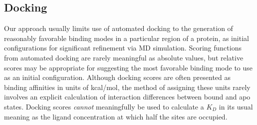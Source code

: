 \documentclass[12pt]{article}
\begin{document}
 \subsection{Docking} Our approach usually limits use of automated docking to the generation of reasonably favorable binding modes in a particular region of a protein, as initial configurations for significant refinement via MD simulation.  Scoring functions from automated docking are rarely meaningful as absolute values, but relative scores may be appropriate for suggesting the most favorable binding mode to use as an initial configuration.  Although docking scores are often presented as binding affinities in units of kcal/mol, the method of assigning these units rarely involves an explicit calculation of interaction differences between bound and apo states.  Docking scores \emph{cannot} meaningfully be used to calculate a $K_{D}$ in its usual meaning as the ligand concentration at which half the sites are occupied.  
\end{document}
